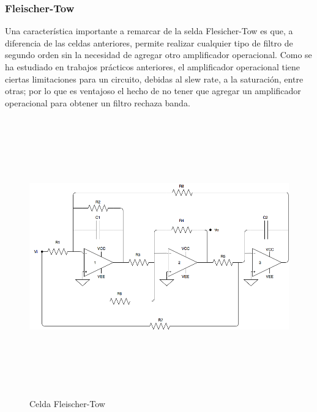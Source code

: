 \subsubsection{Fleischer-Tow}

Una caracter\'istica importante a remarcar de la selda Flesicher-Tow es que, a diferencia de las celdas anteriores, permite realizar cualquier tipo de filtro de segundo orden sin la necesidad de agregar otro amplificador operacional. Como se ha estudiado en trabajos pr\'acticos anteriores, el amplificador operacional tiene ciertas limitaciones para un circuito, debidas al slew rate, a la saturaci\'on, entre otras; por lo que es ventajoso el hecho de no tener que agregar un amplificador operacional para obtener un filtro rechaza banda.


\begin{figure}[H] %
	\centering
	\includegraphics[width=12cm,height=12cm,keepaspectratio]{../EJ4/imagenes/fleischer.png}
	\caption{Celda Fleischer-Tow}
	\label{fleischer}
\end{figure}